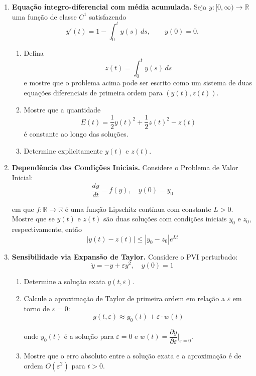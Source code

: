 \documentclass[a4paper,
11pt,  reqno]{amsart}
\begin{document}
\begin{enumerate}
    \item  {\bf Equa\c{c}\~ao \'integro-diferencial com m\'edia acumulada.} Seja $y:[0,\infty)\to\mathbb{R}$ uma fun\c{c}\~ao de classe $C^1$ satisfazendo
\[
y'(t)=1-\int_0^t y(s)\,ds,
\qquad y(0)=0.
\]

\begin{enumerate}
    \item Defina
    \[
    z(t)=\int_0^t y(s)\,ds
    \]
    e mostre que o problema acima pode ser escrito como um sistema de duas equa\c{c}\~oes diferenciais de primeira ordem para $(y(t),z(t))$.
    \item Mostre que a quantidade
    \[
    E(t)=\frac{1}{2}y(t)^2+\frac{1}{2}z(t)^2-z(t)
    \]
    \'e constante ao longo das solu\c{c}\~oes.
    \item Determine explicitamente $y(t)$ e $z(t)$. 
\end{enumerate}

\medskip

\item \textbf{Dependência das Condições Iniciais.}  
Considere o Problema de Valor Inicial:
\[ \dfrac{dy}{dt} = f(y), \quad y(0) = y_0 \]

em que $f: \mathbb{R} \to \mathbb{R}$ é uma função Lipschitz contínua com constante $L > 0$. 
Mostre que se $y(t)$ e $z(t)$ são duas soluções com condições iniciais $y_0$ e $z_0$, respectivamente, então 
\[ |y(t) - z(t)| \leq |y_0 - z_0| e^{Lt} \]

    \medskip

\item \textbf{Sensibilidade via Expansão de Taylor.} Considere o PVI perturbado:
\[ \dot{y} = -y + \varepsilon y^2, \quad y(0) = 1 \]
\begin{enumerate}
    \item Determine a solução exata $y(t, \varepsilon)$.
    \item Calcule a aproximação de Taylor de primeira ordem em relação a $\varepsilon$ em torno de $\varepsilon = 0$:
    \[ y(t, \varepsilon) \approx y_0(t) + \varepsilon \cdot w(t) \]

    onde $y_0(t)$ é a solução para $\varepsilon = 0$ e $w(t) = \dfrac{\partial y}{\partial \varepsilon} \big|_{\varepsilon=0}$.
    \item Mostre que o erro absoluto entre a solução exata e a aproximação é de ordem $O(\varepsilon^2)$ para $t > 0$.
\end{enumerate}

    \medskip


\end{enumerate}
\end{document}
